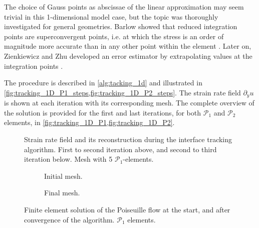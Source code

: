 \documentclass[11 pt]{report}
\begin{document}
The choice of Gauss points as abscissae of the linear approximation may seem trivial in this 1-dimensional model case, but the topic was thoroughly investigated for general geometries. Barlow showed that reduced integration points are superconvergent points, i.e. at which the stress is an order of magnitude more accurate than in any other point within the element \cite{Barlow}. Later on, Zienkiewicz and Zhu developed an error estimator by extrapolating values at the integration points \cite{Zienkiewicz}.

The procedure is described in \cref{alg:tacking_1d} and illustrated in \cref{fig:tracking_1D_P1_steps,fig:tracking_1D_P2_steps}. The strain rate field $\partial_y u$ is shown at each iteration with its corresponding mesh. The complete overview of the solution is provided for the first and last iterations, for both $\mathcal{P}_1$ and $\mathcal{P}_2$ elements, in \cref{fig:tracking_1D_P1,fig:tracking_1D_P2}.




\begin{figure}[hb]
    \centering
    \begin{subfigure}[t]{\textwidth}
        
    \end{subfigure}
    \begin{subfigure}[t]{\textwidth}
        
    \end{subfigure}
    \caption{Strain rate field and its reconstruction during the interface tracking algorithm. First to second iteration above, and second to third iteration below. Mesh with 5 $\mathcal{P}_1$-elements.}
    \label{fig:tracking_1D_P1_steps}
\end{figure}

\begin{figure}[ht]
    \centering
    \begin{subfigure}[t]{\textwidth}
        
        \caption{Initial mesh.}
        \label{fig:tracking_1D_P1_a}
    \end{subfigure}
    \begin{subfigure}[t]{\textwidth}
        
        \caption{Final mesh.}
        \label{fig:tracking_1D_P1_b}
    \end{subfigure}
    \caption{Finite element solution of the Poiseuille flow at the start, and after convergence of the algorithm. $\mathcal{P}_1$ elements.}
    \label{fig:tracking_1D_P1}
\end{figure}
\end{document}
